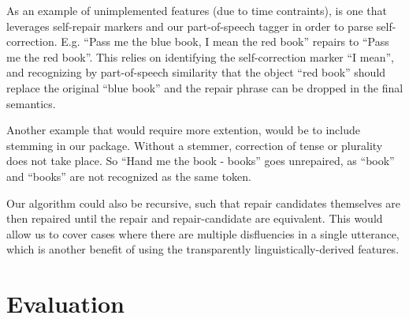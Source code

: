 \documentclass{article}
\begin{document}
\begin{flushleft}

  As an example of unimplemented features (due to time contraints), is one that leverages self-repair markers and our part-of-speech tagger in order to parse self-correction. E.g. ``Pass me the blue book, I mean the red book'' repairs to ``Pass me the red book''. This relies on identifying the self-correction marker ``I mean'', and recognizing by part-of-speech similarity that the object ``red book'' should replace the original ``blue book'' and the repair phrase can be dropped in the final semantics.
  
\end{flushleft}

\begin{flushleft}

  Another example that would require more extention, would be to include stemming in our package. Without a stemmer, correction of tense or plurality does not take place. So ``Hand me the book - books'' goes unrepaired, as ``book'' and ``books'' are not recognized as the same token.
  
  \end{flushleft}
  
\begin{flushleft}

  Our algorithm could also be recursive, such that repair candidates themselves are then repaired until the repair and repair-candidate are equivalent. This would allow us to cover cases where there are multiple disfluencies in a single utterance, which is another benefit of using the transparently linguistically-derived features.
  
\end{flushleft}

\section{Evaluation}
\end{document}
